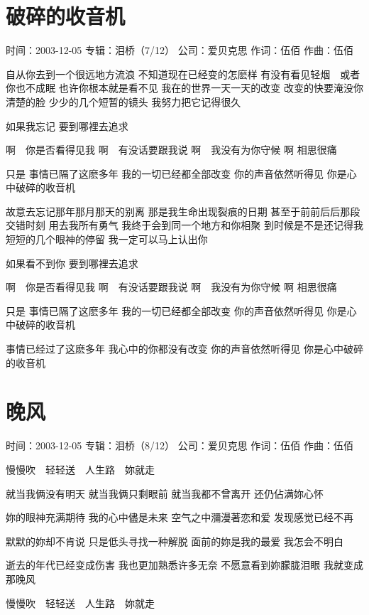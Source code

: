 \documentclass[UTF8,a4paper,oneside,twocolumn,12pt]{ctexbook}
\newcommand{\infopair}[2]{\textbullet #1：#2}
\newcommand{\zc}[1][伍佰]{\infopair{作词}{#1}}
\newcommand{\zq}[1][伍佰]{\infopair{作曲}{#1}}
\newcommand{\zj}[1]{\infopair{专辑}{#1}}
\newcommand{\sj}[1]{\infopair{时间}{#1}}
\newcommand{\gs}[1]{\infopair{公司}{#1}}
\newenvironment{info}{\begin{flushleft}\kaishu
	}
	{\end{flushleft}\normalsize\yahei\par}
\newenvironment{lyric}{
	}
{}
\begin{document}
\section{破碎的收音机}
\begin{info}
	\sj{2003-12-05}
	\zj{泪桥（7/12）}
	\gs{爱贝克思}
	\zc
	\zq
\end{info}
\begin{lyric}
	自从你去到一个很远地方流浪
	不知道现在已经变的怎麽样
	有没有看见轻烟　或者你也不成眠
	也许你根本就是看不见
	我在的世界一天一天的改变
	改变的快要淹没你清楚的脸
	少少的几个短暂的镜头
	我努力把它记得很久

	如果我忘记 要到哪裡去追求

	啊　你是否看得见我
	啊　有没话要跟我说
	啊　我没有为你守候
	啊 相思很痛

	只是
	事情已隔了这麽多年
	我的一切已经都全部改变
	你的声音依然听得见
	你是心中破碎的收音机

	故意去忘记那年那月那天的别离
	那是我生命出现裂痕的日期
	甚至于前前后后那段交错时刻
	用去我所有勇气
	我终于会到同一个地方和你相聚
	到时候是不是还记得我
	短短的几个眼神的停留
	我一定可以马上认出你

	如果看不到你 要到哪裡去追求

	啊　你是否看得见我
	啊　有没话要跟我说
	啊　我没有为你守候
	啊 相思很痛

	只是
	事情已隔了这麽多年
	我的一切已经都全部改变
	你的声音依然听得见
	你是心中破碎的收音机

	事情已经过了这麽多年
	我心中的你都没有改变
	你的声音依然听得见
	你是心中破碎的收音机
\end{lyric}

\section{晚风}
\begin{info}
	\sj{2003-12-05}
	\zj{泪桥（8/12）}
	\gs{爱贝克思}
	\zc
	\zq
\end{info}
\begin{lyric}
	慢慢吹　轻轻送　人生路　妳就走

	就当我俩没有明天
	就当我俩只剩眼前
	就当我都不曾离开
	还仍佔满妳心怀

	妳的眼神充满期待
	我的心中儘是未来
	空气之中瀰漫著恋和爱
	发现感觉已经不再

	默默的妳却不肯说
	只是低头寻找一种解脱
	面前的妳是我的最爱
	我怎会不明白

	逝去的年代已经变成伤害
	我也更加熟悉许多无奈
	不愿意看到妳朦胧泪眼
	我就变成那晚风

	慢慢吹　轻轻送　人生路　妳就走
\end{lyric}
\end{document}
